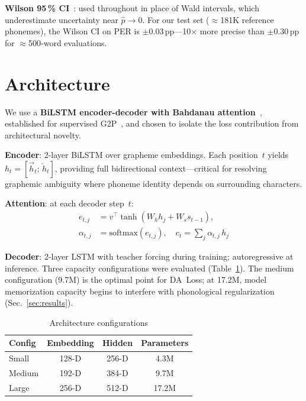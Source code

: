 \documentclass[conference]{IEEEtran}
\begin{document}
\textbf{Wilson 95\,\% CI}~\cite{wilson1927probable,brown2001interval}:
used throughout in place of Wald intervals, which underestimate
uncertainty near $\hat{p}\!\to\!0$.
For our test set ($\approx$181K reference phonemes), the Wilson CI on
PER is $\pm$0.03\,pp---10$\times$ more precise than
$\pm$0.30\,pp for $\approx$500-word evaluations.

\section{Architecture}

We use a \textbf{BiLSTM encoder-decoder with Bahdanau
attention}~\cite{bahdanau2014neural}, established for supervised
G2P~\cite{rao2015g2p}, and chosen to isolate the loss contribution
from architectural novelty.

\textbf{Encoder}: 2-layer BiLSTM over grapheme embeddings.
Each position~$t$ yields $h_t\!=\![\overrightarrow{h}_t;\,
\overleftarrow{h}_t]$, providing full bidirectional context---critical
for resolving graphemic ambiguity where phoneme identity depends on
surrounding characters.

\textbf{Attention}: at each decoder step~$t$:
\begin{align}
  e_{t,j} &= v^\top \tanh(W_h h_j + W_s s_{t-1}), \nonumber \\
  \alpha_{t,j} &= \mathrm{softmax}(e_{t,j}), \quad
  c_t = \textstyle\sum_j \alpha_{t,j}\, h_j
  \label{eq:attention}
\end{align}

\textbf{Decoder}: 2-layer LSTM with teacher forcing during training;
autoregressive at inference.
Three capacity configurations were evaluated
(Table~\ref{tab:configs}).
The medium configuration (9.7M) is the optimal point for DA~Loss;
at 17.2M, model memorization capacity begins to interfere with
phonological regularization (Sec.~\ref{sec:results}).

\begin{table}[t]
  \caption{Architecture configurations}
  \label{tab:configs}
  \centering\small
  \begin{tabular}{lccc}
    \toprule
    Config  & Embedding & Hidden & Parameters \\
    \midrule
    Small   & 128-D & 256-D & 4.3M \\
    Medium  & 192-D & 384-D & 9.7M \\
    Large   & 256-D & 512-D & 17.2M \\
    \bottomrule
  \end{tabular}
\end{table}
\end{document}
